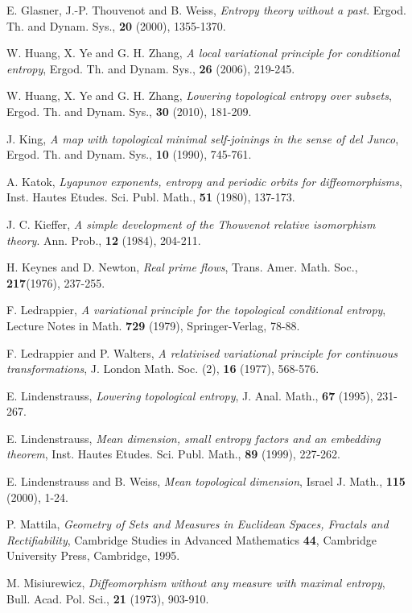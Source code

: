 \documentclass[12pt]{amsart}
\theoremstyle{definition} \theoremstyle{question}
\numberwithin{equation}{section}
\begin{document}
\begin{thebibliography}{99}
 E. Glasner, J.-P. Thouvenot and B. Weiss, {\it Entropy theory without
a past}. Ergod. Th. and Dynam. Sys., {\bf 20} (2000), 1355-1370.

 W. Huang, X. Ye and G. H. Zhang, \emph{A local
variational principle for conditional entropy}, {Ergod. Th. and
Dynam. Sys., \bf 26} (2006), 219-245.

 W. Huang, X. Ye and G. H. Zhang, \emph{Lowering
topological entropy over subsets}, Ergod. Th. and Dynam. Sys., {\bf
30} (2010), 181-209.

 J. King, {\it A map with topological minimal self-joinings in
the sense of del Junco}, Ergod. Th. and Dynam. Sys., {\bf 10}
(1990), 745-761.

 A. Katok, \emph{Lyapunov exponents, entropy
and periodic orbits for diffeomorphisms}, {Inst. Hautes Etudes. Sci.
Publ. Math., \bf 51} (1980), 137-173.

 J. C. Kieffer, {\it A simple development of the Thouvenot relative
isomorphism theory}. Ann. Prob., {\bf 12} (1984), 204-211.

 H. Keynes and D. Newton, {\it Real prime flows}, Trans. Amer. Math.
Soc., {\bf 217}(1976), 237-255.

 F. Ledrappier, \emph{A variational principle
for the topological conditional entropy}, {Lecture Notes in Math.
\bf 729} (1979), Springer-Verlag, 78-88.

 F. Ledrappier and P.
Walters, \emph{A relativised variational principle for continuous
transformations}, {J. London Math. Soc. (2), \bf 16} (1977),
568-576.

 E. Lindenstrauss, \emph{Lowering topological entropy},
{J. Anal. Math., \bf 67} (1995), 231-267.

 E. Lindenstrauss,
\emph{Mean dimension, small entropy factors and an embedding
theorem}, {Inst. Hautes Etudes. Sci. Publ. Math., \bf 89} (1999),
227-262.

 E. Lindenstrauss and B. Weiss,
\emph{Mean topological dimension}, {Israel J. Math., \bf 115}
(2000), 1-24.

 P. Mattila, \emph{Geometry of Sets and Measures in Euclidean
Spaces, Fractals and Rectifiability}, {Cambridge Studies in Advanced
Mathematics \bf 44}, Cambridge University Press, Cambridge, 1995.

 M. Misiurewicz, \emph{Diffeomorphism without
any measure with maximal entropy}, {Bull. Acad. Pol. Sci., \bf 21}
(1973), 903-910.


\end{thebibliography}
\end{document}
